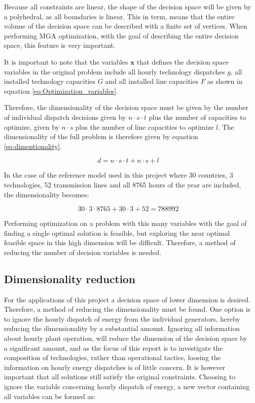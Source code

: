 Because all constraints are linear, the shape of the decision space will be given by a polyhedral, as all boundaries is linear. This in term, means that the entire volume of the decision space can be described with a finite set of vertices. When performing MGA optimization, with the goal of describing the entire decision space, this feature is very important. 

It is important to note that the variables $\mathbf{x}$ that defines the decision space variables in the original problem include all hourly technology dispatches $g$, all installed technology capacities $G$ and all installed line capacities $F$ as shown in equation \ref{eq:Optimization_variables}. 

Therefore, the dimensionality of the decision space must be given by the number of individual dispatch decisions given by $n\cdot s \cdot t$ plus the number of capacities to optimize, given by $n\cdot s$ plus the number of line capacities to optimize $l$. The dimensionality of the full problem is therefore given by equation \vref{eq:dimentionality}.

\begin{equation}\label{eq:dimentionality}
d = n\cdot s \cdot t + n\cdot s + l
\end{equation}

In the case of the reference model used in this project where 30 countries, 3 technologies, 52 transmission lines and all 8765 hours of the year are included, the dimensionality becomes: 
 
\begin{equation*}
	30 \cdot 3 \cdot 8765 + 30 \cdot 3 + 52 = 788992
\end{equation*}

Performing optimization on a problem with this many variables with the goal of finding a single optimal solution is feasible, but exploring the near optimal feasible space in this high dimension will be difficult. Therefore, a method of reducing the number of decision variables is needed. 


\subsection{Dimensionality reduction}\label{sec:dim_reduction}

For the applications of this project a decision space of lower dimension is desired. Therefore, a method of reducing the dimensionality must be found. One option is to ignore the hourly dispatch of energy from the individual generators, hereby reducing the dimensionality by a substantial amount. 
Ignoring all information about hourly plant operation, will reduce the dimension of the decision space by a significant amount, and as the focus of this report is to investigate the composition of technologies, rather than operational tactics, loosing the information on hourly energy dispatches is of little concern. It is however important that all solutions still satisfy the original constraints. 
Choosing to ignore the variable concerning hourly dispatch of energy, a new vector containing all variables can be formed as: 

